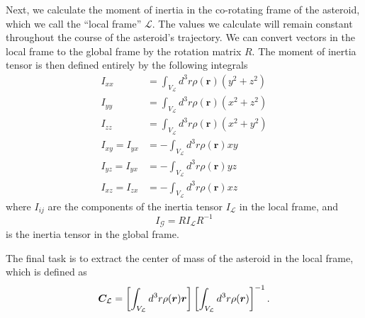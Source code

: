 \documentclass[aps,twocolumn,secnumarabic,balancelastpage,amsmath,amssymb,nofootinbib,floatfix]{revtex4-1}
\begin{document}
Next, we calculate the moment of inertia in the co-rotating frame of the asteroid, which we call the ``local frame'' $\mathcal{L}$. The values we calculate will remain constant throughout the course of the asteroid's trajectory. We can convert vectors in the local frame to the global frame by the rotation matrix $R$. The moment of inertia tensor is then defined entirely by the following integrals
\begin{equation}
\begin{aligned}
    I_{xx} &= \int_{V_\mathcal{L}} d^3 r  \rho(\bm r) (y^2 + z^2) \\
    I_{yy} &= \int_{V_\mathcal{L}} d^3 r  \rho(\bm r) (x^2 + z^2) \\
    I_{zz} &= \int_{V_\mathcal{L}} d^3 r  \rho(\bm r) (x^2 + y^2) \\
    I_{xy}=I_{yx} &= -\int_{V_\mathcal{L}} d^3r \rho(\bm r) xy \\
    I_{yz}=I_{yx} &= -\int_{V_\mathcal{L}} d^3r \rho(\bm r) yz\\
    I_{xz}=I_{zx} &= -\int_{V_\mathcal{L}} d^3r \rho(\bm r) xz
    \label{eqn:moi-local}
\end{aligned}
\end{equation}
where $I_{ij}$ are the components of the inertia tensor $I_\mathcal{L}$ in the local frame, and
\begin{equation}
    I_\mathcal{G} = R I_\mathcal{L} R^{-1}
    \label{eqn:moi-global}
\end{equation}
is the inertia tensor in the global frame.

The final task is to extract the center of mass of the asteroid in the local frame, which is defined as 
\begin{equation}
    \bm C_\mathcal{L} = \left[ \int_{V_\mathcal{L}} d^3 r \rho(\bm r)\bm r \right]\left[ \int_{V_\mathcal{L}} d^3 r \rho(\bm r) \right]^{-1}.
    \label{eqn:com}
\end{equation}
\end{document}

